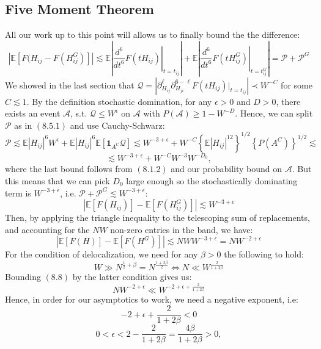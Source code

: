\documentclass[11pt]{article}
\begin{document}
\subsection{Five Moment Theorem}
All our work up to this point will allows us to finally bound the the difference: $$\left\vert \mathbb{E}\left[ F(H_{ij} - F(H_{ij}^G)\right]\right\vert \lesssim \mathbb{E}\left\vert\left.\frac{d^6}{dt^6}F(tH_{ij})\right\vert_{t=t_{ij}}\right\vert+\mathbb{E}\left\vert\left.\frac{d^6}{dt^6}F(tH_{ij}^G)\right\vert_{t=t_{ij}^G}\right\vert = \mathcal{P} + \mathcal{P}^G$$
We showed in the last section that $\mathcal{Q}=\left\vert \partial_{H_{ij}}^\ell \partial_{H_{ji}}^{6-\ell} F(tH_{ij})|_{t=t_{ij}}\right\vert\prec W^{-C}$ for some $C\lesssim 1$. By the definition stochastic domination, for any $\epsilon>0$ and $D>0$, there exists an event $\mathcal{A}$, s.t. $\mathcal{Q}\leq W^\epsilon$ on $\mathcal{A}$ with $P(\mathcal{A})\geq 1-W^{-D}$. Hence, we can split $\mathcal{P}$ as in $(8.5.1)$ and use Cauchy-Schwarz: 
$$\mathcal{P}\lesssim \mathbb{E}|H_{ij}|^6W^\epsilon + \mathbb{E}|H_{ij}|^6 \mathbb{E}\left[\mathbf{1}_{A^C}\mathcal{Q}\right]\lesssim W^{-3+\epsilon} + W^{-C} \left\{\mathbb{E}|H_{ij}|^{12}\right\}^{1/2} \left\{P(A^C)\right\}^{1/2}\lesssim$$
$$\lesssim W^{-3+\epsilon} + W^{-C} W^{-3} W^{-D_0},$$
where the last bound follows from $(8.1.2)$ and our probability bound on $\mathcal{A}$. But this means that we can pick $D_0$ large enough so the stochastically dominating term is $W^{-3+\epsilon}$, i.e. $\mathcal{P}+\mathcal{P}^G\lesssim W^{-3+\epsilon}$: $$\left\vert \mathbb{E}\left[F(H_{ij})\right] - \mathbb{E}\left[F(H_{ij}^G)\right]\right\vert\lesssim W^{-3+\epsilon}$$
Then, by applying the triangle inequality to the telescoping sum of replacements, and accounting for the $NW$ non-zero entries in the band, we have: 
 \begin{equation*} \left\vert \mathbb{E}\left[F(H)\right] - \mathbb{E}\left[F(H^G)\right]\right\vert\lesssim NWW^{-3+\epsilon} = NW^{-2+\epsilon}\tag{8.8}
 \end{equation*}
\noindent For the condition of delocalization, we need for any $\beta>0$ the following to hold:
 $$W\gg N^{\frac{1}{2}+\beta} = N^{\frac{1+2\beta}{2}}\Leftrightarrow N\ll W^{\frac{2}{1+2\beta}}$$
\noindent Bounding $(8.8)$ by the latter condition gives us:
  $$NW^{-2+\epsilon}\ll W^{-2+\epsilon+\frac{2}{1+2\beta}}$$
\noindent Hence, in order for our asymptotics to work, we need a negative exponent, i.e: $$-2+\epsilon + \frac{2}{1+2\beta}<0$$
  $$0<\epsilon <2-\frac{2}{1+2\beta} = \frac{4\beta}{1+2\beta}>0,$$
\end{document}
